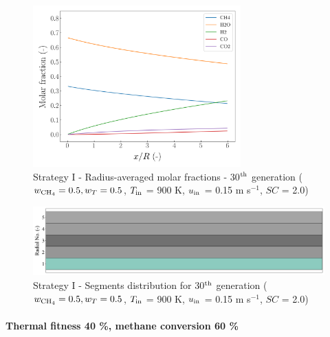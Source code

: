 \documentclass[preprint,12pt]{elsarticle}
\begin{document}
\begin{figure}[h!]
\centering
\includegraphics[width=80mm]{results/5/50C_50T/GEN30-AVG.png}
\caption{\label{fig:5R5050G30-avg} Strategy I - Radius-averaged molar fractions -  30$^{\rm{th}}$ generation ($w_{\rm{CH_4}} = 0.5, w_T = 0.5$, $T_{\rm{in}}$ = 900 K, $u_{\rm{in}}$ = 0.15 m s$^{-1}$, $SC$ = 2.0)}
\end{figure}

\begin{figure}[h!]
\centering
\includegraphics[width=120mm]{results/segments/5seg/50C50T/seg.png}
\caption{\label{fig:30L6040G1-TField} Strategy I - Segments distribution for 30$^{\rm{th}}$ generation ($w_{\rm{CH_4}} = 0.5, w_T = 0.5$, $T_{\rm{in}}$ = 900 K, $u_{\rm{in}}$ = 0.15 m s$^{-1}$, $SC$ = 2.0)}
\end{figure}



\clearpage



\paragraph{Thermal fitness 40 \%, methane conversion 60 \%} \hspace{0pt} \\
\noindent 
\end{document}
